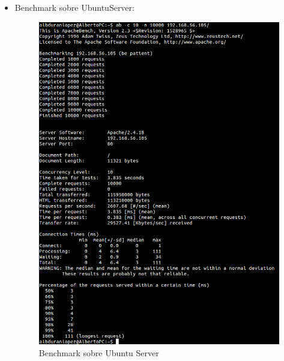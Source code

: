 \begin{itemize}
	\item Benchmark sobre UbuntuServer:
	\begin{figure}[h]
		\centering
		\includegraphics[scale=0.347]{images/Bubuntu.png}
		\caption{Benchmark sobre Ubuntu Server}
	\end{figure}
	

\end{itemize}
